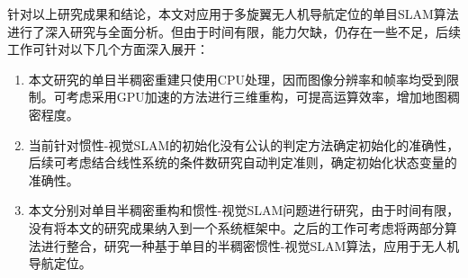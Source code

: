 \begin{conclusion}
针对以上研究成果和结论，本文对应用于多旋翼无人机导航定位的单目SLAM算法进行了深入研究与全面分析。但由于时间有限，能力欠缺，仍存在一些不足，后续工作可针对以下几个方面深入展开：
\begin{enumerate}  [label={(\arabic*)}]
\item 本文研究的单目半稠密重建只使用CPU处理，因而图像分辨率和帧率均受到限制。可考虑采用GPU加速的方法进行三维重构，可提高运算效率，增加地图稠密程度。
\item 当前针对惯性-视觉SLAM的初始化没有公认的判定方法确定初始化的准确性，后续可考虑结合线性系统的条件数研究自动判定准则，确定初始化状态变量的准确性。
\item 本文分别对单目半稠密重构和惯性-视觉SLAM问题进行研究，由于时间有限，没有将本文的研究成果纳入到一个系统框架中。之后的工作可考虑将两部分算法进行整合，研究一种基于单目的半稠密惯性-视觉SLAM算法，应用于无人机导航定位。
\end{enumerate}





\end{conclusion}